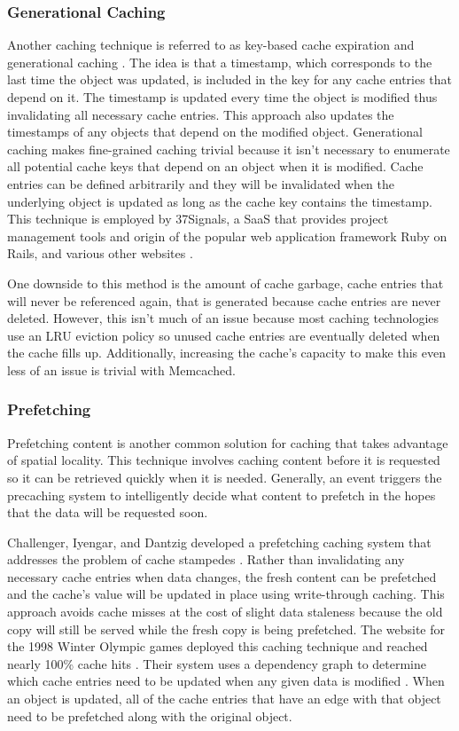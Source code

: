 \documentclass[12pt]{ucthesis}
\begin{document}
\subsubsection{Generational Caching}
Another caching technique is referred to as key-based cache expiration \cite{keyBasedCacheExpiration} and generational caching \cite{generationalCaching}.
The idea is that a timestamp, which corresponds to the last time the object was updated, is included in the key for any cache entries that depend on it.
The timestamp is updated every time the object is modified thus invalidating all necessary cache entries.
This approach also updates the timestamps of any objects that depend on the modified object.
Generational caching makes fine-grained caching trivial because it isn't necessary to enumerate all potential cache keys that depend on an object when it is modified.
Cache entries can be defined arbitrarily and they will be invalidated when the underlying object is updated as long as the cache key contains the timestamp.
This technique is employed by \textsf{37Signals}, a SaaS that provides project management tools and origin of the popular web application framework Ruby on Rails\cite{37SignalsDotCom}, and various other websites \cite{keyBasedCacheExpiration}.

One downside to this method is the amount of cache garbage, cache entries that will never be referenced again, that is generated because cache entries are never deleted.
However, this isn't much of an issue because most caching technologies use an LRU eviction policy so unused cache entries are eventually deleted when the cache fills up.
Additionally, increasing the cache's capacity to make this even less of an issue is trivial with \textsf{Memcached}.

\subsubsection{Prefetching}
Prefetching content is another common solution for caching that takes advantage of spatial locality.
This technique involves caching content before it is requested so it can be retrieved quickly when it is needed.
Generally, an event triggers the precaching system to intelligently decide what content to prefetch in the hopes that the data will be requested soon.

Challenger, Iyengar, and Dantzig developed a prefetching caching system that addresses the problem of cache stampedes \cite{scalableConsistentCaching}.
Rather than invalidating any necessary cache entries when data changes, the fresh content can be prefetched and the cache's value will be updated in place using write-through caching.
This approach avoids cache misses at the cost of slight data staleness because the old copy will still be served while the fresh copy is being prefetched.
The website for the 1998 Winter Olympic games deployed this caching technique and reached nearly 100\% cache hits \cite{scalableConsistentCaching}.
Their system uses a dependency graph to determine which cache entries need to be updated when any given data is modified \cite{scalableConsistentCaching}.
When an object is updated, all of the cache entries that have an edge with that object need to be prefetched along with the original object.
\end{document}
